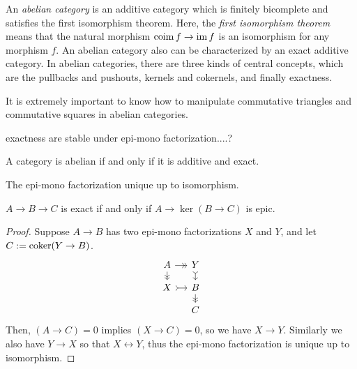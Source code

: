 \documentclass{../../large}
\begin{document}
\begin{prb}
An \emph{abelian category} is an additive category which is finitely bicomplete and satisfies the first isomorphism theorem.
Here, the \emph{first isomorphism theorem} means that the natural morphism $\operatorname{coim} f\to\operatorname{im} f$ is an isomorphism for any morphism $f$.
An abelian category also can be characterized by an exact additive category.
In abelian categories, there are three kinds of central concepts, which are the pullbacks and pushouts, kernels and cokernels, and finally exactness.

It is extremely important to know how to manipulate commutative triangles and commutative squares in abelian categories.

exactness are stable under epi-mono factorization....?


\begin{parts}
\item A category is abelian if and only if it is additive and exact.
\item The epi-mono factorization unique up to isomorphism.
\item $A\to B\to C$ is exact if and only if $A\to\ker(B\to C)$ is epic.
\end{parts}
\end{prb}
\begin{proof}

Suppose $A\to B$ has two epi-mono factorizations $X$ and $Y$, and let $C:=\operatorname{coker}(Y\to B)$.
\[\begin{tikzcd}[sep=small]
A \rar[->>]\dar[->>] & Y \dar[>->] \\
X \rar[>->] & B \dar[->>]\\
& C
\end{tikzcd}\]
Then, $(A\to C)=0$ implies $(X\to C)=0$, so we have $X\to Y$.
Similarly we also have $Y\to X$ so that $X\leftrightarrow Y$, thus the epi-mono factorization is unique up to isomorphism.
\end{proof}
\end{document}
